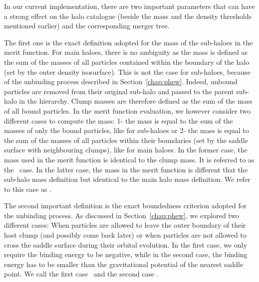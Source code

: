 In our current implementation, there are two important parameters that
can have a strong effect on the halo catalogue (beside the mass and
the density thresholds mentioned earlier) and the corresponding merger
tree.

The first one is the exact definition adopted for the mass of the
sub-haloes in the merit function.  For main haloes, there is no
ambiguity as the mass is defined as the sum of the masses of all
particles contained within the boundary of the halo (set by the outer
density isosurface). This is not the case for sub-haloes, because of the
unbinding process described in Section~\ref{chap:phew}. Indeed,
unbound particles are removed from their original sub-halo and passed
to the parent sub-halo in the hierarchy.  Clump masses are therefore
defined as the sum of the mass of all bound particles.  In the merit
function evaluation, we however consider two different cases to
compute the mass: 1- the mass is equal to the sum of the masses of
only the bound particles, like for sub-haloes or 2- the mass is equal
to the sum of the masses of all particles within their boundaries (set
by the saddle surface with neighbouring clumps), like for main haloes.
In the former case, the mass used in the merit function is identical
to the clump mass. It is referred to as the \exc\ case.  In the latter
case, the mass in the merit function is different that the sub-halo
mass definition but identical to the main halo mass definition.  We
refer to this case as \inc.

The second important definition is the exact boundedness criterion
adopted for the unbinding process.  As discussed in
Section~\ref{chap:phew}, we explored two different cases: When
particles are allowed to leave the outer boundary of their host clump
(and possibly come back later) or when particles are not allowed to
cross the saddle surface during their orbital evolution. In the first
case, we only require the binding energy to be negative, while in the
second case, the binding energy has to be smaller than the
gravitational potential of the nearest saddle point.  We call the
first case \nosad\ and the second case \sad.

